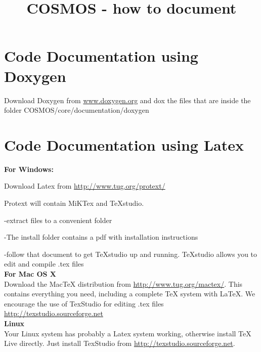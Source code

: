 \documentclass[10pt,letterpaper]{article}
\title{COSMOS - how to document}
\begin{document}
\maketitle
\tableofcontents


\section{Code Documentation using Doxygen}
Download Doxygen from \url{www.doxygen.org} and dox the files that are inside the folder COSMOS/core/documentation/doxygen


\section{Code Documentation using Latex}

\textbf{For Windows:}

Download Latex from \url{http://www.tug.org/protext/}

Protext will contain MiKTex and TeXstudio.

-extract files to a convenient folder

-The install folder contains a pdf with installation instructions

-follow that document to get TeXstudio up and running. TeXstudio allows you to edit and compile .tex files \\

\textbf{For Mac OS X}\\
Download the MacTeX distribution from  \url{http://www.tug.org/mactex/}. This contains everything you need, including a complete TeX system with LaTeX. We encourage the use of TexStudio for editing .tex files \url{http://texstudio.sourceforge.net} \\


\textbf{Linux}\\
Your Linux system has probably a Latex system working,  otherwise install TeX Live directly. Just install TexStudio from \url{http://texstudio.sourceforge.net}.
\end{document}
